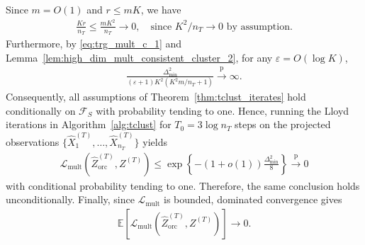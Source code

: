 \documentclass[10pt]{article}
\newcommand{\convp}{\xrightarrow{\mathrm{p}}}
\newcommand{\wh}{\widehat}
\newcommand{\trg}{T}
\newcommand{\nT}{n_{\trg}}
\newcommand{\Ztar}{Z^{(\trg)}}
\newcommand{\hatXtar}{\wh{X}^{(\trg)}}
\newcommand{\hatZtar}{\wh{Z}^{(\trg)}}
\newcommand{\src}{S}
\begin{document}
Since $m=O(1)$ and $r\le mK$, we have
\begin{align}
\label{eq:rank_term_vanish}
    \frac{Kr}{\nT}\le \frac{mK^2}{\nT}\to 0, \quad \mbox{since $K^2/\nT \to 0$ by assumption.}
\end{align}
Furthermore, by \eqref{eq:trg_mult_c_1} and
Lemma~\ref{lem:high_dim_mult_consistent_cluster_2}, for any
$\varepsilon=O(\log K)$,
\begin{align}
\label{eq:good_projected_separation_event}
    \frac{\Delta_{\min}^2}
    {(\varepsilon+1)K^2\left(K^2m/\nT+1\right)}
    \convp \infty.
\end{align}
Consequently, all assumptions of Theorem~\ref{thm:tclust_iterates} hold
conditionally on $\mathcal F_\src$ with probability tending to one. Hence,
running the Lloyd iterations in Algorithm~\ref{alg:tclust} for
$T_0=3\log\nT$ steps on the projected observations
$\{\hatXtar_1,\ldots,\hatXtar_{\nT}\}$ yields
\begin{align}
\label{eq:foldwise_misclustering_bound}
    \mathcal L_{\mathrm{mult}}(\hatZtar_{\mathrm{orc}},\Ztar)
    \le
    \exp\left\{-(1+o(1))\frac{\Delta_{\min}^2}{8}\right\}
    \convp 0
\end{align}
with conditional probability tending to one. Therefore, the same conclusion
holds unconditionally. Finally, since $\mathcal L_{\mathrm{mult}}$ is bounded,
dominated convergence gives
\begin{align}
    \mathbb E\left[\mathcal L_{\mathrm{mult}}(\hatZtar_{\mathrm{orc}},\Ztar)\right]\to 0.
\end{align}
\end{document}
